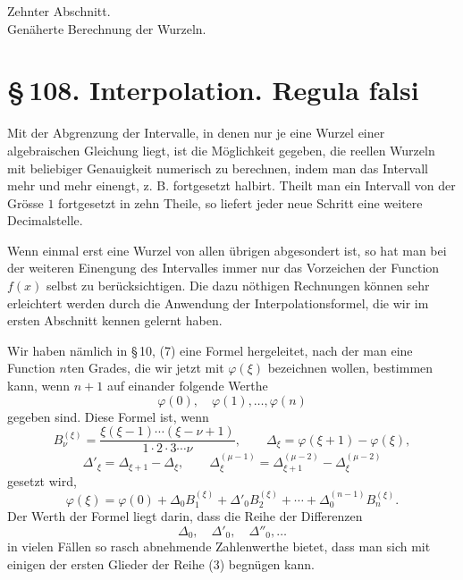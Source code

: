 \documentclass[11pt]{article}
\providecommand{\sect}[2]{\section*{\S\,#1. #2}}
\begin{document}
\newcommand{\weberfigtwentyfive}{
\begin{center}
\begin{tikzpicture}[scale=0.95,line cap=round]
\draw (-1.6,0)--(2.2,0);
\draw (-1.25,-1.1)--(-1.25,1.35);
\draw (1.55,-1.1)--(1.55,1.35);
\draw[smooth,domain=-1.25:1.55,variable=\t] plot ({\t},{-0.95+2.1*((\t+1.25)/2.8)^2});
\draw (-1.25,-0.95)--(1.55,1.12);
\draw (0.45,0)--(1.55,1.12);
\draw (1.12,0)--(1.55,1.12);
\node at (-1.35,-0.16){$\alpha$};
\node at (0.45,-0.16){$\alpha'$};
\node at (1.10,-0.16){$\beta'$};
\node at (1.68,-0.16){$\beta$};
\end{tikzpicture}\\[-0.2em]
{\small Fig. 25.}
\end{center}
}


\begin{center}
{\Large Zehnter Abschnitt.}\\[0.6em]
{\large Genäherte Berechnung der Wurzeln.}
\end{center}

\sect{108}{Interpolation. Regula falsi}

Mit der Abgrenzung der Intervalle, in denen nur je eine Wurzel einer algebraischen Gleichung liegt, ist die Möglichkeit gegeben, die reellen Wurzeln mit beliebiger Genauigkeit numerisch zu berechnen, indem man das Intervall mehr und mehr einengt, z. B. fortgesetzt halbirt. Theilt man ein Intervall von der Grösse $1$ fortgesetzt in zehn Theile, so liefert jeder neue Schritt eine weitere Decimalstelle.

Wenn einmal erst eine Wurzel von allen übrigen abgesondert ist, so hat man bei der weiteren Einengung des Intervalles immer nur das Vorzeichen der Function $f(x)$ selbst zu berücksichtigen. Die dazu nöthigen Rechnungen können sehr erleichtert werden durch die Anwendung der Interpolationsformel, die wir im ersten Abschnitt kennen gelernt haben.

Wir haben nämlich in \S\,10, (7) eine Formel hergeleitet, nach der man eine Function $n$ten Grades, die wir jetzt mit $\varphi(\xi)$ bezeichnen wollen, bestimmen kann, wenn $n+1$ auf einander folgende Werthe
\[
        \varphi(0),\quad \varphi(1),\ldots,\varphi(n)
\]
gegeben sind. Diese Formel ist, wenn
\begin{equation}
        B_\nu^{(\xi)}=
        \frac{\xi(\xi-1)\cdots(\xi-\nu+1)}
             {1\cdot2\cdot3\cdots\nu},\qquad
        \Delta_\xi=\varphi(\xi+1)-\varphi(\xi),
\tag{1}
\end{equation}
\[
        \Delta'_\xi=\Delta_{\xi+1}-\Delta_\xi,\qquad
        \Delta_\xi^{(\mu-1)}
        =\Delta_{\xi+1}^{(\mu-2)}-\Delta_\xi^{(\mu-2)}
\tag{2}
\]
gesetzt wird,
\begin{equation}
        \varphi(\xi)=\varphi(0)+
        \Delta_0B_1^{(\xi)}+\Delta'_0B_2^{(\xi)}
        +\cdots+\Delta_0^{(n-1)}B_n^{(\xi)}.
\tag{3}
\end{equation}
Der Werth der Formel liegt darin, dass die Reihe der Differenzen
\[
        \Delta_0,\quad \Delta'_0,\quad \Delta''_0,\ldots
\]
in vielen Fällen so rasch abnehmende Zahlenwerthe bietet, dass man sich mit einigen der ersten Glieder der Reihe (3) begnügen kann.
\end{document}
